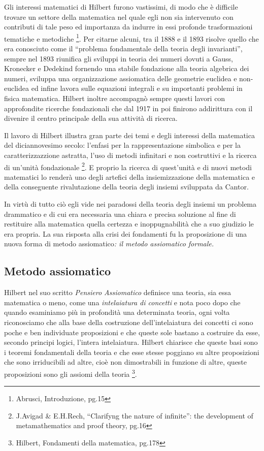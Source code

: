 Gli interessi matematici di Hilbert furono vastissimi, di modo che
è difficile trovare un settore della matematica nel quale egli non
sia intervenuto con contributi di tale peso ed importanza da indurre
in essi profonde trasformazioni tematiche e metodiche%
\footnote{Abrusci, Introduzione, pg.15%
}. Per citarne alcuni, tra il 1888 e il 1893 risolve quello che era
conosciuto come il {}``problema fondamentale della teoria degli invarianti'',
sempre nel 1893 riunifica gli sviluppi in teoria dei numeri dovuti
a Gauss, Kronecker e Dedekind fornendo una stabile fondazione alla
teoria algebrica dei numeri, sviluppa una organizzazione assiomatica
delle geometrie euclidea e non-euclidea ed infine lavora sulle equazioni
integrali e su importanti problemi in fisica matematica. Hilbert inoltre
accompagnò sempre questi lavori con approfondite ricerche fondazionali
che dal 1917 in poi finirono addirittura con il divenire il centro
principale della sua attività di ricerca.

Il lavoro di Hilbert illustra gran parte dei temi e degli interessi
della matematica del diciannovesimo secolo: l'enfasi per la rappresentazione
simbolica e per la caratterizzazzione astratta, l'uso di metodi infinitari
e non costruttivi e la ricerca di un'unità fondazionale%
\footnote{J.Avigad \& E.H.Rech, {}``Clarifyng the nature of infinite'': the
development of metamathematics and proof theory, pg.16%
}. E proprio la ricerca di quest'unità e di nuovi metodi matematici
lo renderà uno degli artefici della insiemizzazione della matematica
e della conseguente rivalutazione della teoria degli insiemi sviluppata
da Cantor. 

In virtù di tutto ciò egli vide nei paradossi della teoria degli insiemi
un problema drammatico e di cui era necessaria una chiara e precisa
soluzione al fine di restituire alla matematica quella certezza e
inoppugnabilità che a suo giudizio le era propria. La sua risposta
alla crisi dei fondamenti fu la proposizione di una nuova forma di
metodo assiomatico\emph{: il metodo assiomatico formale.}


\subsection{Metodo assiomatico}

Hilbert nel suo scritto \emph{Pensiero Assiomatico }definisce una
teoria, sia essa matematica o meno, come una \emph{intelaiatura di
concetti} e nota poco dopo che quando esaminiamo più in profondità
una determinata teoria, ogni volta riconosciamo che alla base della
costruzione dell'intelaiatura dei concetti ci sono poche e ben individuate
proposizioni e che queste sole bastano a costruire da esse, secondo
principi logici, l'intera intelaiatura. Hilbert chiarisce che queste
basi sono i teoremi fondamentali della teoria e che esse stesse poggiano
su altre proposizioni che sono irriducibili ad altre, cioè non dimostrabili
in funzione di altre, queste proposizioni sono gli assiomi della teoria%
\footnote{Hilbert, Fondamenti della matematica, pg.178%
}.

